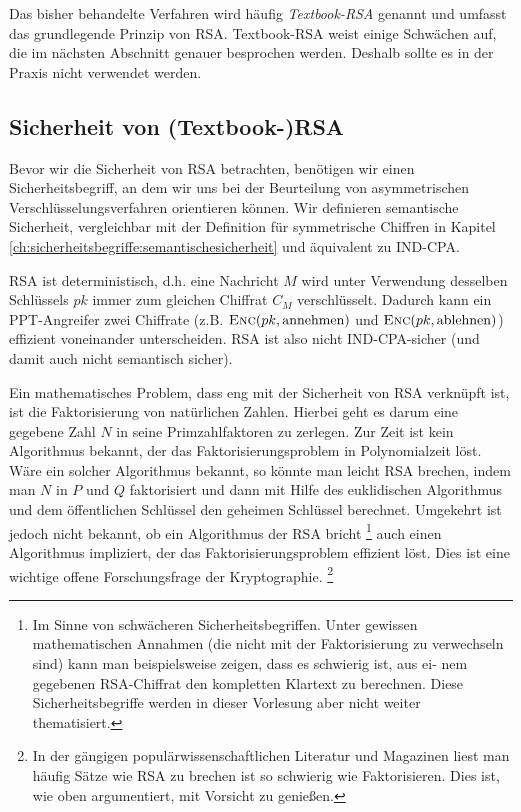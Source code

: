 Das bisher behandelte Verfahren wird häufig \textit{Textbook-RSA}
\indexRSATextBook genannt und umfasst das grundlegende Prinzip von
RSA. Textbook-RSA weist einige Schwächen auf, die im nächsten Abschnitt
genauer besprochen werden. Deshalb sollte es in der Praxis nicht
verwendet werden.

\subsection{Sicherheit von (Textbook-)RSA}
\label{ch:asymmenc:rsa:sicherheit} Bevor wir die Sicherheit von RSA
betrachten, benötigen wir einen Sicherheitsbegriff, an dem wir uns bei
der Beurteilung von asymmetrischen Verschlüsselungsverfahren orientieren
können. Wir definieren semantische Sicherheit, vergleichbar mit der
Definition für symmetrische Chiffren in Kapitel
\ref{ch:sicherheitsbegriffe:semantischesicherheit} und äquivalent zu
IND-CPA.

RSA ist deterministisch, d.h. eine Nachricht $M$ wird unter Verwendung
desselben Schlüssels $pk$ immer zum gleichen Chiffrat $C_M$
verschlüsselt. Dadurch kann ein PPT-Angreifer zwei Chiffrate
(z.B. $\textsc{Enc}(pk, \text{annehmen})$ und $\textsc{Enc}(pk, \text{ablehnen})$)
effizient voneinander unterscheiden. RSA ist also nicht IND-CPA-sicher
(und damit auch nicht semantisch sicher).

Ein mathematisches Problem, dass eng mit der Sicherheit von RSA
verknüpft ist, ist die Faktorisierung von natürlichen Zahlen. Hierbei
geht es darum eine gegebene Zahl $N$ in seine Primzahlfaktoren zu
zerlegen. Zur Zeit ist kein Algorithmus bekannt, der das
Faktorisierungsproblem in Polynomialzeit löst. Wäre ein solcher
Algorithmus bekannt, so könnte man leicht RSA \glqq brechen\grqq , indem
man $N$ in $P$ und $Q$ faktorisiert und dann mit Hilfe des euklidischen
Algorithmus und dem öffentlichen Schlüssel den geheimen Schlüssel
berechnet. Umgekehrt ist jedoch nicht bekannt, ob ein Algorithmus der
RSA bricht \footnote{Im Sinne von schwächeren
  Sicherheitsbegriffen. Unter gewissen mathematischen Annahmen (die nicht
  mit der Faktorisierung zu verwechseln sind) kann man beispielsweise
  zeigen, dass es schwierig ist, aus ei- nem gegebenen RSA-Chiffrat den
  kompletten Klartext zu berechnen. Diese Sicherheitsbegriffe werden in
  dieser Vorlesung aber nicht weiter thematisiert.} auch einen Algorithmus
impliziert, der das Faktorisierungsproblem effizient löst. Dies ist eine
wichtige offene Forschungsfrage der Kryptographie. \footnote{In der
  gängigen populärwissenschaftlichen Literatur und Magazinen liest man
  häufig Sätze wie \glqq RSA zu brechen ist so schwierig wie
  Faktorisieren\grqq. Dies ist, wie oben argumentiert, mit Vorsicht zu
  genießen.}

